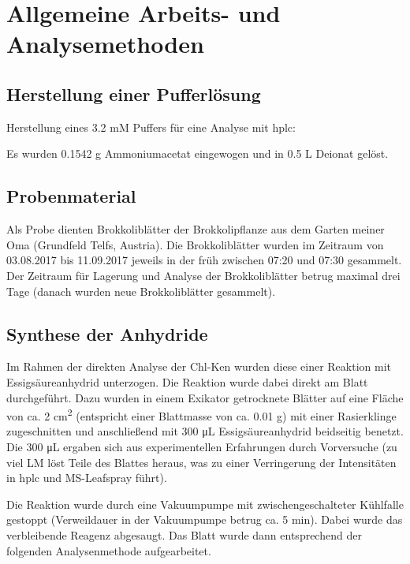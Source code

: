 \chapter{Allgemeine Arbeits- und Analysemethoden}

\section{Herstellung einer Pufferlösung}

Herstellung eines 3.2 mM  Puffers für eine Analyse mit \gls{hplc}:

Es wurden 0.1542 g Ammoniumacetat eingewogen und in 0.5 L Deionat gelöst.

\section{Probenmaterial}

Als Probe dienten Brokkoliblätter der Brokkolipflanze aus dem Garten meiner Oma (Grundfeld Telfs, Austria). Die Brokkoliblätter wurden im Zeitraum von 03.08.2017 bis 11.09.2017 jeweils in der früh zwischen 07:20 und 07:30 gesammelt. Der Zeitraum für Lagerung und Analyse der Brokkoliblätter betrug maximal drei Tage (danach wurden neue Brokkoliblätter gesammelt). \\

\section{Synthese der Anhydride} \label{sec:ReaktionEssig}

Im Rahmen der direkten Analyse der \gls{Chl-K}en wurden diese einer Reaktion mit Essigsäureanhydrid unterzogen. Die Reaktion wurde dabei direkt am Blatt durchgeführt. Dazu wurden in einem Exikator getrocknete Blätter auf eine Fläche von ca. 2 cm\textsuperscript{2} (entspricht einer Blattmasse von ca. 0.01 g) mit einer Rasierklinge zugeschnitten und anschließend mit 300 \si{\uL} Essigsäureanhydrid beidseitig benetzt. Die 300 \si{\uL} ergaben sich aus experimentellen Erfahrungen durch Vorversuche (zu viel LM löst Teile des Blattes heraus, was zu einer Verringerung der Intensitäten in \gls{hplc} und MS-Leafspray führt). 

Die Reaktion wurde durch eine Vakuumpumpe mit zwischengeschalteter Kühlfalle gestoppt (Verweildauer in der Vakuumpumpe betrug ca. 5 min). Dabei wurde das verbleibende Reagenz abgesaugt. Das Blatt wurde dann entsprechend der folgenden Analysenmethode aufgearbeitet.

